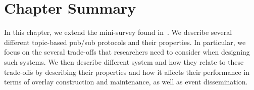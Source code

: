 \section{Chapter Summary}

In this chapter, we extend the mini-survey found in~\cite{Setty:2012}.
We describe several different topic-based pub/sub protocols and their
properties. In particular, we focus on the several trade-offs that
researchers need to consider when designing such systems. We then
describe different system and how they relate to these trade-offs by
describing their properties and how it affects their performance in
terms of overlay construction and maintenance, as well as event dissemination.
